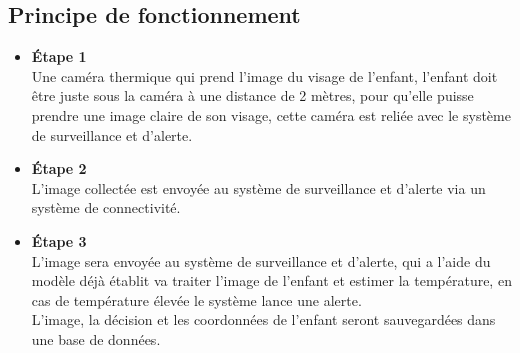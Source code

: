 \documentclass[12pt]{article}
\begin{document}
\subsection{Principe de fonctionnement}
\begin{itemize}
	\item \textbf{Étape 1}\\
	Une caméra thermique qui prend l'image du visage de l'enfant, l'enfant doit être juste sous la caméra à une distance de 2 mètres, pour qu’elle puisse prendre une image claire de son visage, cette caméra est reliée avec le système de surveillance et d'alerte.
	\item \textbf{Étape 2}\\
	L'image collectée est envoyée au système de surveillance et d'alerte via un système de connectivité.
	\item \textbf{Étape 3}\\
	L'image sera envoyée  au système de surveillance et d'alerte, qui a l'aide du modèle déjà établit va traiter l'image de l’enfant et estimer la température, en cas de température élevée le système lance une alerte.\\
	L'image, la décision et les coordonnées de l'enfant seront sauvegardées dans une base de données.
\end{itemize}
\end{document}
